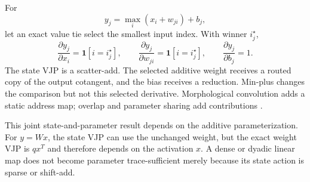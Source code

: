 \documentclass[10pt]{article}
\begin{document}
For
\begin{equation}
 y_j=\max_i(x_i+w_{ji})+b_j,
\end{equation}
let an exact value tie select the smallest input index.  With winner
$i_j^\star$,
\begin{equation}
 \frac{\partial y_j}{\partial x_i}=\mathbf{1}[i=i_j^\star],\qquad
 \frac{\partial y_j}{\partial w_{ji}}=\mathbf{1}[i=i_j^\star],\qquad
 \frac{\partial y_j}{\partial b_j}=1.
\end{equation}
The state VJP is a scatter-add.  The selected additive weight receives a routed
copy of the output cotangent, and the bias receives a reduction.  Min-plus
changes the comparison but not this selected derivative.  Morphological
convolution adds a static address map; overlap and parameter sharing add
contributions \citep{franchi2020morphological,groenendijk2023geometric}.

This joint state-and-parameter result depends on the additive parameterization.
For $y=Wx$, the state VJP can use the unchanged weight, but the exact weight
VJP is $qx^T$ and therefore depends on the activation $x$.  A dense or dyadic
linear map does not become parameter trace-sufficient merely because its state
action is sparse or shift-add.
\end{document}
